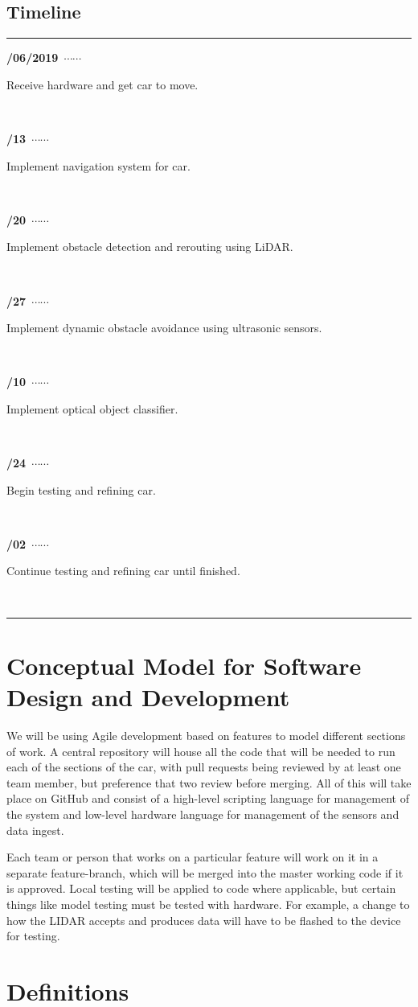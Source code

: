 \documentclass[onecolumn, draftclsnofoot, 10pt, compsoc]{IEEEtran}
\newcommand\ytl[2]{
\parbox[b]{8em}{\hfill{\color{cyan}\bfseries\sffamily #1}~$\cdots\cdots$~}\makebox[0pt][c]{$\bullet$}\vrule\quad \parbox[c]{4.5cm}{\vspace{7pt}\color{red!40!black!80}\raggedright\sffamily #2.\\[7pt]}\\[-3pt]}
\begin{document}
\subsection{Timeline}

\begin{center}
\begin{minipage}[t]{.6\linewidth}
\color{gray}
\rule{\linewidth}{1pt}
\ytl{01/06/2019}{Receive hardware and get car to move}
\ytl{01/13}{Implement navigation system for car}
\ytl{01/20}{Implement obstacle detection and rerouting using LiDAR}
\ytl{01/27}{Implement dynamic obstacle avoidance using ultrasonic sensors}
\ytl{02/10}{Implement optical object classifier}
\ytl{02/24}{Begin testing and refining car}
\ytl{03/02}{Continue testing and refining car until finished}
\bigskip
\rule{\linewidth}{1pt}
\end{minipage}
\end{center}
\section{Conceptual Model for Software Design and Development}

We will be using Agile development based on features to model different sections of work. A central repository will house all the code that will be needed to run each of the sections of the car, with pull requests being reviewed by at least one team member, but preference that two review before merging. All of this will take place on GitHub and consist of a high-level scripting language for management of the system and low-level hardware language for management of the sensors and data ingest. 

Each team or person that works on a particular feature will work on it in a separate feature-branch, which will be merged into the master working code if it is approved. Local testing will be applied to code where applicable, but certain things like model testing must be tested with hardware. For example, a change to how the LIDAR accepts and produces data will have to be flashed to the device for testing.

\section{Definitions}
\end{document}
